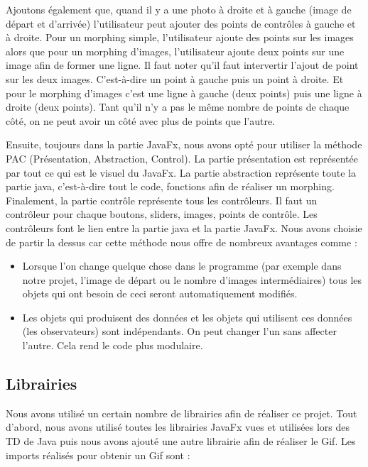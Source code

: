 \documentclass[11pt, titlepage]{article}
\begin{document}
Ajoutons également que, quand il y a une photo à droite et à gauche (image de départ et d’arrivée) l’utilisateur peut ajouter des points de contrôles à gauche et à droite. Pour un morphing simple, l’utilisateur ajoute des points sur les images alors que pour un morphing d’images, l’utilisateur ajoute deux points sur une image afin de former une ligne. Il faut noter qu’il faut intervertir l’ajout de point sur les deux images. C'est-à-dire un point à gauche puis un point à droite. Et pour le morphing d’images c’est une ligne à gauche (deux points) puis une ligne à droite (deux points). Tant qu’il n’y a pas le même nombre de points de chaque côté, on ne peut avoir un côté avec plus de points que l’autre. 

Ensuite, toujours dans la partie JavaFx, nous avons opté pour utiliser la méthode PAC (Présentation, Abstraction, Control). La partie présentation est représentée par tout ce qui est le visuel du JavaFx. La partie abstraction représente toute la partie java, c'est-à-dire tout le code, fonctions afin de réaliser un morphing. Finalement, la partie contrôle représente tous les contrôleurs. Il faut un contrôleur pour chaque boutons, sliders, images, points de contrôle. Les contrôleurs font le lien entre la partie java et la partie JavaFx. Nous avons choisie de partir la dessus car cette méthode nous offre de nombreux avantages comme :



\begin{itemize}
	\item Lorsque l’on change quelque chose dans le programme (par exemple dans notre projet, l’image de départ ou le nombre d’images intermédiaires) tous les objets qui ont besoin de ceci seront automatiquement modifiés.
	\item Les objets qui produisent des données  et les objets qui utilisent ces données (les observateurs) sont indépendants. On peut changer l'un sans affecter l'autre. Cela rend le code plus modulaire.
\end{itemize}




\subsection{Librairies}

Nous avons utilisé un certain nombre de librairies afin de réaliser ce projet. Tout d’abord, nous avons utilisé toutes les librairies JavaFx vues et utilisées lors des TD de Java puis nous avons ajouté une autre librairie afin de réaliser le Gif. Les imports réalisés pour obtenir un Gif sont : 
\end{document}
